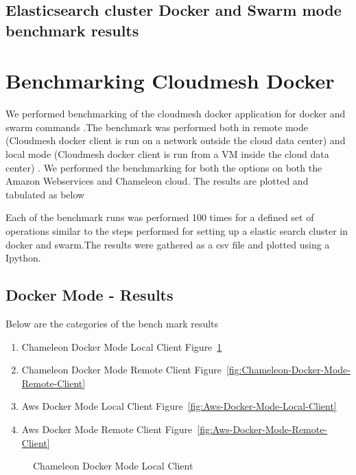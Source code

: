 \documentclass[9pt,twocolumn,twoside]{../../styles/osajnl}
\begin{document}
 \subsection{Elasticsearch cluster Docker and Swarm mode benchmark results}
 



 
\section{Benchmarking Cloudmesh Docker} 
We performed benchmarking of the cloudmesh docker application for docker and  swarm commands .The benchmark was performed both in remote mode (Cloudmesh docker client is run on a network outside the cloud data center) and local mode (Cloudmesh docker client is run from a VM  inside the cloud data center) . We
performed the benchmarking for both the options on both the Amazon Webservices\cite{www-AWS} and Chameleon cloud\cite{www-Chameleon}.
The results are plotted and tabulated as below

Each of the benchmark runs was performed 100 times for a defined set of operations similar to the steps performed for setting up a elastic search cluster in docker and swarm.The results were gathered as a csv file  and plotted using a Ipython\cite{www-ipython}.


\subsection{Docker Mode - Results}

Below are the categories of the bench mark results
\begin{enumerate}
\item Chameleon Docker Mode Local Client Figure~\ref{fig:Chameleon-Docker-Mode-Local-Client}
\item Chameleon Docker Mode Remote Client Figure~\ref{fig:Chameleon-Docker-Mode-Remote-Client}
\item Aws Docker Mode Local Client Figure~\ref{fig:Aws-Docker-Mode-Local-Client}
\item Aws Docker Mode Remote Client Figure~\ref{fig:Aws-Docker-Mode-Remote-Client}
\end{enumerate}


\begin{figure}[ht]
\centering
{}
\caption{Chameleon Docker Mode Local Client}
\label{fig:Chameleon-Docker-Mode-Local-Client}
\end{figure}
\end{document}
